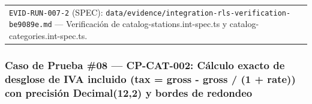 \documentclass[10pt,a4paper]{article}
\begin{document}
{\begin{longtable}[]{@{}
  >{\raggedright\arraybackslash}p{}
  >{\raggedright\arraybackslash}p{}@{}}
\begin{minipage}[t]{\linewidth}
\texttt{EVID-{}\allowbreak{}RUN-{}\allowbreak{}007-{}\allowbreak{}2} (SPEC): \texttt{data/\allowbreak{}evidence/\allowbreak{}integration-{}\allowbreak{}rls-{}\allowbreak{}verification-{}\allowbreak{}be9089e.\allowbreak{}md} --- Verificación de catalog-stations.int-spec.ts y catalog-categories.int-spec.ts.\strut
\end{minipage} \\
\end{longtable}
}

\endgroup\medskip


\subsubsection{Caso de Prueba \#08 --- CP-CAT-002: Cálculo exacto de desglose de IVA incluido (tax = gross - gross / (1 + rate)) con precisión Decimal(12,2) y bordes de redondeo}\label{caso-de-prueba-08--cp-cat-002-cuxe1lculo-exacto-de-desglose-de-iva-incluido-tax--gross---gross--1--rate-con-precisiuxf3n-decimal122-y-bordes-de-redondeo}

\begingroup\singlespacing\footnotesize\setlength{\parskip}{0pt}
\end{document}
